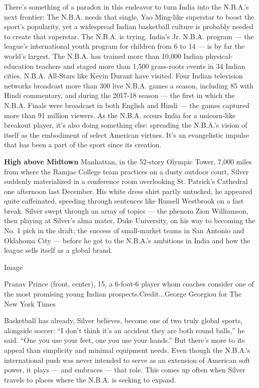 There's something of a paradox in this endeavor to turn India into the
N.B.A.'s next frontier: The N.B.A. needs that single, Yao Ming-like
superstar to boost the sport's popularity, yet a widespread Indian
basketball culture is probably needed to create that superstar. The
N.B.A. is trying. India's Jr. N.B.A. program --- the league's
international youth program for children from 6 to 14 --- is by far the
world's largest. The N.B.A. has trained more than 10,000 Indian
physical-education teachers and staged more than 1,500 grass-roots
events in 34 Indian cities. N.B.A. All-Stars like Kevin Durant have
visited. Four Indian television networks broadcast more than 300 live
N.B.A. games a season, including 85 with Hindi commentary, and during
the 2017-18 season --- the first in which the N.B.A. Finals were
broadcast in both English and Hindi --- the games captured more than 91
million viewers. As the N.B.A. scours India for a unicorn-like breakout
player, it's also doing something else: spreading the N.B.A.'s vision of
itself as the embodiment of select American virtues. It's an
evangelistic impulse that has been a part of the sport since its
creation.

\textbf{High above Midtown} Manhattan, in the 52-story Olympic Tower,
7,000 miles from where the Ramjas College team practices on a dusty
outdoor court, Silver suddenly materialized in a conference room
overlooking St. Patrick's Cathedral one afternoon last December. His
white dress shirt partly untucked, he appeared quite caffeinated,
speeding through sentences like Russell Westbrook on a fast break.
Silver swept through an array of topics --- the phenom Zion Williamson,
then playing at Silver's alma mater, Duke University, on his way to
becoming the No. 1 pick in the draft; the success of small-market teams
in San Antonio and Oklahoma City --- before he got to the N.B.A.'s
ambitions in India and how the league sells itself as a global brand.

Image

Pranav Prince (front, center), 15, a 6-foot-6 player whom coaches
consider one of the most promising young Indian
prospects.Credit...George Georgiou for The New York Times

Basketball has already, Silver believes, become one of two truly global
sports, alongside soccer: ``I don't think it's an accident they are both
round balls,'' he said. ``One you use your feet, one you use your
hands.'' But there's more to its appeal than simplicity and minimal
equipment needs. Even though the N.B.A.'s international push was never
intended to serve as an extension of American soft power, it plays ---
and embraces --- that role. This comes up often when Silver travels to
places where the N.B.A. is seeking to expand.


